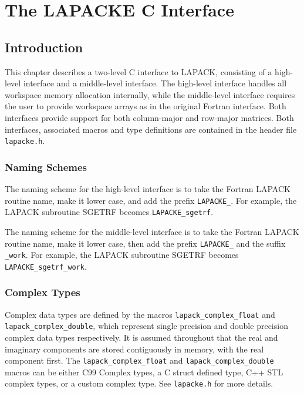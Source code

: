 \chapter{The LAPACKE C Interface}\label{chapcinterface}

\section{Introduction}

This chapter describes a two-level C interface to LAPACK, consisting of a high-level interface and
a middle-level interface. 
The high-level interface handles all workspace memory allocation
internally, while the middle-level interface requires the user to provide workspace arrays as in the
original Fortran interface. Both interfaces provide support for both column-major and row-major
matrices. Both interfaces, associated macros and type definitions are
contained in the header file {\tt lapacke.h}.

\subsection{Naming Schemes}

The naming scheme for the high-level interface is to take the Fortran LAPACK routine name, make
it lower case, and add the prefix {\tt LAPACKE\_}. For example, the LAPACK subroutine SGETRF
becomes {\tt LAPACKE\_sgetrf}.

The naming scheme for the middle-level interface is to take the Fortran LAPACK routine name,
make it lower case, then add the prefix {\tt LAPACKE\_} and the suffix {\tt \_work}.
For example, the LAPACK subroutine SGETRF becomes {\tt LAPACKE\_sgetrf\_work}.

\subsection{Complex Types}

Complex data types are defined by the macros {\tt lapack\_complex\_float} and
{\tt lapack\_complex\_double}, which represent single precision and double precision complex data
types respectively. 
It is assumed throughout that the real and imaginary components are stored
contiguously in memory, with the real component first. The {\tt lapack\_complex\_float} and
{\tt lapack\_complex\_double} macros can be either C99 Complex types, a C struct defined type, C++ STL complex types, or a custom complex type. See {\tt lapacke.h} for more details.

